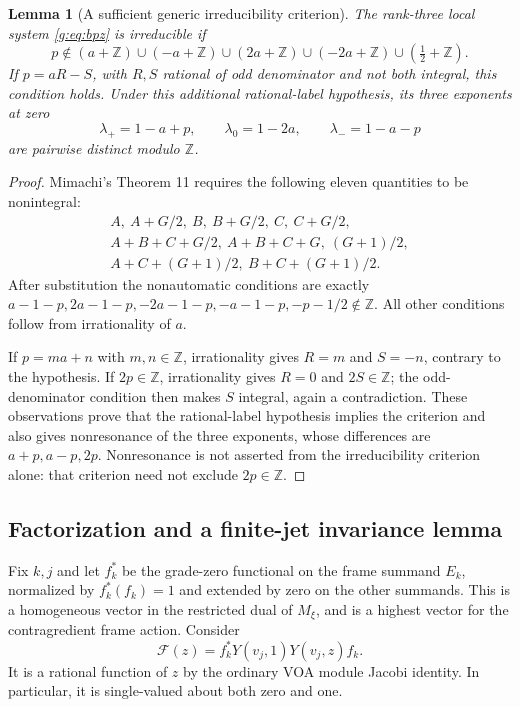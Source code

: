 \documentclass[11pt,a4paper]{article}
\numberwithin{equation}{section}
\newtheorem{lemma}[theorem]{Lemma}
\theoremstyle{definition}\newtheorem{definition}[theorem]{Definition}
\theoremstyle{remark}\newtheorem{remark}[theorem]{Remark}
\begin{document}
\begin{lemma}[A sufficient generic irreducibility criterion]
\label{g:lem:bpz-irreducible}
The rank-three local system \eqref{g:eq:bpz} is irreducible if
\[
 p\notin(a+\mathbb Z)\cup(-a+\mathbb Z)
       \cup(2a+\mathbb Z)\cup(-2a+\mathbb Z)
       \cup(\tfrac12+\mathbb Z).
\]
If $p=aR-S$, with $R,S$ rational of odd denominator and not both
integral, this condition holds. Under this additional rational-label
hypothesis, its three exponents at zero
\[
 \lambda_+=1-a+p,\qquad
 \lambda_0=1-2a,\qquad
 \lambda_-=1-a-p
\]
are pairwise distinct modulo $\mathbb Z$.
\end{lemma}
\begin{proof}
Mimachi's Theorem 11 requires the following eleven quantities to be
nonintegral:
\begin{gather*}
 A,\ A+G/2,\ B,\ B+G/2,\ C,\ C+G/2,\\
 A+B+C+G/2,\ A+B+C+G,\ (G+1)/2,\\
 A+C+(G+1)/2,\ B+C+(G+1)/2.
\end{gather*}
After substitution the nonautomatic conditions are exactly
$a-1-p,2a-1-p,-2a-1-p,-a-1-p,-p-1/2\notin\mathbb Z$.
All other conditions follow from irrationality of $a$.

If $p=ma+n$ with $m,n\in\mathbb Z$, irrationality gives
$R=m$ and $S=-n$, contrary to the hypothesis. If $2p\in\mathbb Z$,
irrationality gives $R=0$ and $2S\in\mathbb Z$; the odd-denominator
condition then makes $S$ integral, again a contradiction. These
observations prove that the rational-label hypothesis implies the
criterion and also gives nonresonance of the three exponents, whose
differences are $a+p,a-p,2p$. Nonresonance is not asserted from the
irreducibility criterion alone: that criterion need not exclude
$2p\in\mathbb Z$.
\end{proof}

\subsection{Factorization and a finite-jet invariance lemma}
Fix $k,j$ and let $f_k^*$ be the grade-zero functional on the frame
summand $E_k$, normalized by $f_k^*(f_k)=1$ and extended by zero on
the other summands. This is a homogeneous vector in the restricted
dual of $M_\xi$, and is a highest vector for the contragredient frame
action. Consider
\[
 \mathcal F(z)=f_k^*Y(v_j,1)Y(v_j,z)f_k.
\]
It is a rational function of $z$ by the ordinary VOA module Jacobi
identity. In particular, it is single-valued about both zero and one.
\end{document}
